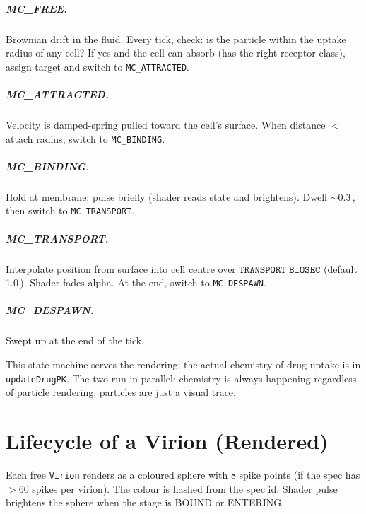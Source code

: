 \documentclass[11pt,letterpaper,twoside,openany]{book}
\newcommand{\code}[1]{\texttt{#1}}
\newcommand{\biosec}{\text{bio-s}}
\begin{document}
\paragraph{MC\_FREE.} Brownian drift in the fluid. Every tick,
check: is the particle within the uptake radius of any cell?
If yes and the cell can absorb (has the right receptor class),
assign target and switch to \code{MC\_ATTRACTED}.

\paragraph{MC\_ATTRACTED.} Velocity is damped-spring pulled toward
the cell's surface. When distance $<$ attach radius, switch to
\code{MC\_BINDING}.

\paragraph{MC\_BINDING.} Hold at membrane; pulse briefly (shader
reads state and brightens). Dwell $\sim$0.3\,\biosec, then switch
to \code{MC\_TRANSPORT}.

\paragraph{MC\_TRANSPORT.} Interpolate position from surface
into cell centre over $\code{TRANSPORT\_BIOSEC}$ (default
1.0\,\biosec). Shader fades alpha. At the end, switch to
\code{MC\_DESPAWN}.

\paragraph{MC\_DESPAWN.} Swept up at the end of the tick.

This state machine serves the rendering; the actual chemistry of
drug uptake is in \code{updateDrugPK}. The two run in parallel:
chemistry is always happening regardless of particle rendering;
particles are just a visual trace.

\chapter{Lifecycle of a Virion (Rendered)}
\label{ch:virion-life}

Each free \code{Virion} renders as a coloured sphere with 8
spike points (if the spec has $> 60$ spikes per virion). The
colour is hashed from the spec id. Shader pulse brightens the
sphere when the stage is BOUND or ENTERING.
\end{document}
